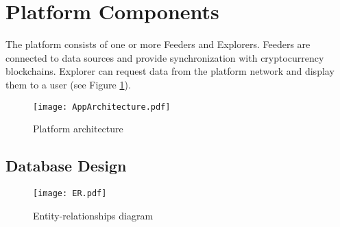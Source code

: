 \section{Platform Components}
The platform consists of one or more Feeders and Explorers. Feeders are connected to data sources and provide synchronization with cryptocurrency blockchains. Explorer can request data from the platform network and display them to a user (see Figure \ref{appArchitecture}).

\begin{figure}[h]
    \centering
    \texttt{[image: AppArchitecture.pdf]}
    \caption{Platform architecture}
    \label{appArchitecture}
\end{figure}

\subsection{Database Design}
\label{design}

\begin{figure}[h]
    \centering
    \texttt{[image: ER.pdf]}
    \caption{Entity-relationships diagram}
    \label{er}
\end{figure}

